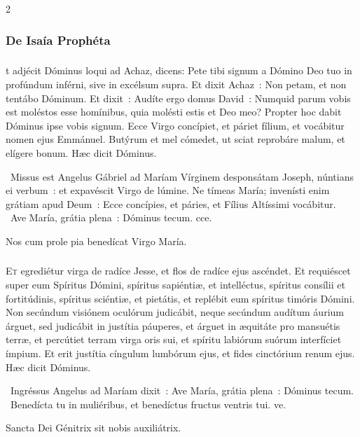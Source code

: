 \documentclass[9pt,twoside]{extarticle}
\begin{document}
\begin{multicols}{2}
\subsubsection*{\center De Isaía Prophéta}
\subsubsection*{\center {}}
t adjécit Dóminus loqui ad Achaz, dicens:
Pete tibi signum a Dómino Deo tuo in profúndum inférni, sive in excélsum supra.
Et dixit Achaz~: Non petam, et non tentábo Dóminum.
Et dixit~: Audíte ergo domus David~: Numquid parum vobis est moléstos esse homínibus, quia molésti estis et Deo meo?
Propter hoc dabit Dóminus ipse vobis signum. Ecce Virgo concípiet, et páriet fílium, et vocábitur nomen ejus Emmánuel.
Butýrum et mel cómedet, ut sciat reprobáre malum, et elígere bonum. Hæc dicit Dóminus.

\begin{tightlist}{}
\item {}~Missus est Angelus Gábriel ad Maríam Vírginem desponsátam Joseph, núntians ei verbum~: et expavéscit Virgo de lúmine. Ne tímeas María; invenísti enim grátiam apud Deum~: \textred{*} Ecce concípies, et páries, et Fílius Altíssimi vocábitur.  ~Ave María, grátia plena~: Dóminus tecum. cce.
\item {\small {} Nos cum prole pia benedícat Virgo María.}
\end{tightlist}

\subsubsection*{}
\lettrine{E}t egrediétur virga de radíce Jesse, et flos de radíce ejus ascéndet.
Et requiéscet super eum Spíritus Dómini, spíritus sapiéntiæ, et intelléctus, spíritus consílii et fortitúdinis, spíritus sciéntiæ, et pietátis,
et replébit eum spíritus timóris Dómini. Non secúndum visiónem oculórum judicábit, neque secúndum audítum áurium árguet,
sed judicábit in justítia páuperes, et árguet in æquitáte pro mansuétis terræ, et percútiet terram virga oris sui, et spíritu labiórum suórum interfíciet ímpium.
Et erit justítia cíngulum lumbórum ejus, et fides cinctórium renum ejus.
Hæc dicit Dóminus.

\begin{tightlist}{}
\item {}~Ingréssus Angelus ad Maríam dixit~: \textred{*} Ave María, grátia plena~: Dóminus tecum. ~Benedícta tu in muliéribus, et benedíctus fructus ventris tui. ve.
\item {\small {} Sancta Dei Génitrix sit nobis auxiliátrix.}
\end{tightlist}


\end{multicols}
\end{document}
